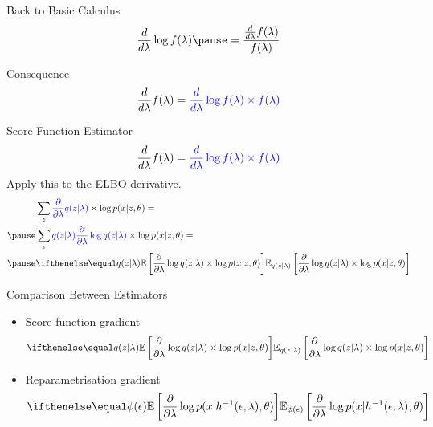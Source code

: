 \documentclass[14pt]{beamer}
\begin{document}
\begin{frame}{Back to Basic Calculus}
\begin{equation*}
\frac{d}{d\lambda}\log f(\lambda) \pause = \frac{\frac{d}{d\lambda}f(\lambda)}{f(\lambda)}
\end{equation*}
\pause
\begin{block}{Consequence}
\begin{equation*}
\frac{d}{d\lambda}f(\lambda) = \textcolor{blue}{\frac{d}{d\lambda}\log f(\lambda) \times f(\lambda)}
\end{equation*}
\end{block}
\end{frame}

\begin{frame}{Score Function Estimator}
\begin{equation*}
\frac{d}{d\lambda}f(\lambda) = \textcolor{blue}{\frac{d}{d\lambda}\log f(\lambda) \times f(\lambda)}
\end{equation*}
\pause
Apply this to the ELBO derivative.
\begin{equation*}
\begin{aligned}
&\sum_{z}\textcolor{blue}{\frac{\partial}{\partial \lambda}q(z|\lambda)}\times\log p(x|z,\theta) = \\
\pause
&\sum_{z}\textcolor{blue}{q(z|\lambda)\frac{\partial}{\partial \lambda}\log q(z|\lambda)} \times \log p(x|z,\theta) = \\
\pause
&\E[q(z|\lambda)]{\frac{\partial}{\partial \lambda}\log q(z|\lambda) \times \log p(x|z,\theta)}
\end{aligned}
\end{equation*}
\end{frame}

\begin{frame}{Comparison Between Estimators}
\begin{itemize}
\item Score function gradient
\begin{equation*}
\E[q(z|\lambda)]{\frac{\partial}{\partial \lambda}\log q(z|\lambda) \times \log p(x|z,\theta)}
\end{equation*}
\item Reparametrisation gradient
\begin{equation*}
\E[\phi(\epsilon)]{\frac{\partial}{\partial \lambda} \log p(x|h^{-1}(\epsilon, \lambda),\theta)}
\end{equation*}
\end{itemize}
\end{frame}
\end{document}
